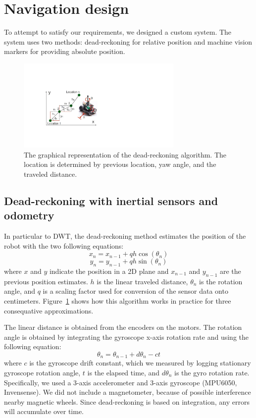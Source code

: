 \section{Navigation design}
To attempt to satisfy our requirements, we designed a custom system. The system uses two methods: dead-reckoning for relative position and machine vision markers for providing absolute position. 

\begin{figure}[h]
\centering
\includegraphics[width=8.0cm]{pictures/chapter5/visual_navigation.pdf}
\caption{The graphical representation of the dead-reckoning algorithm. The location is determined by previous location, yaw angle, and the traveled distance. }
\label{fig:graphical_dead_reck}
\end{figure}

\subsection{Dead-reckoning with inertial sensors and odometry}
In particular to DWT,  the dead-reckoning method estimates the position of the robot with the two following equations:
\[x_{n} = x_{n-1}+qh\cos(\theta_{n})\]
\[y_{n} = y_{n-1}+qh\sin(\theta_{n})\]
where $x$ and $y$ indicate the position in a 2D plane and $x_{n-1}$ and $y_{n-1}$ are the previous position estimates.  $h$ is the linear traveled distance, $\theta_n$ is the rotation angle, and $q$ is a scaling factor used for conversion of the sensor data onto centimeters. Figure~\ref{fig:graphical_dead_reck} shows how this algorithm works in practice for three consequative approximations. 

 The linear distance is obtained from the encoders on the motors. The rotation angle is obtained by integrating the gyroscope x-axis rotation rate and using the following equation: 
\[\theta_{n}=\theta_{n-1}+d\theta_{n}-ct\]
where $c$ is the gyroscope drift constant, which we measured by logging stationary gyroscope rotation angle, $t$ is the elapsed time, and $d\theta_{n}$ is the gyro rotation rate. Specifically, we used a 3-axis accelerometer and 3-axis gyroscope (MPU6050, Invensense). We did not include a magnetometer, because of possible interference nearby magnetic wheels.   Since dead-reckoning is based on integration, any errors will accumulate over time. 

